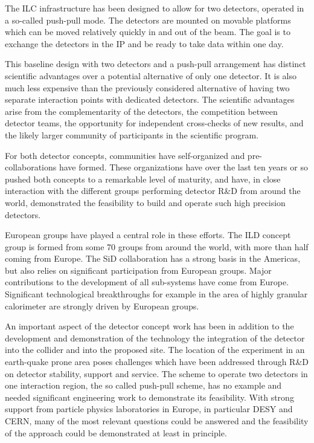 \documentclass[%
 reprint,
 amsmath,amssymb,
 aps,
]{revtex4-1}
\begin{document}
The ILC infrastructure has been designed to allow for two detectors, operated in a so-called push-pull mode. The detectors are mounted on movable platforms which can be moved relatively quickly in and out of the beam. The goal is to exchange the detectors in the IP and be ready to take data within one day. 

This baseline design with two detectors and a push-pull arrangement has distinct scientific advantages over a potential alternative of only one detector. It is also much less expensive than the previously considered alternative of having two separate interaction points with dedicated detectors. The scientific advantages arise from the complementarity of the detectors, the competition between detector teams, the opportunity for independent cross-checks of new results, and the likely larger community of participants in the scientific program. 

For both detector concepts, communities have self-organized and pre-collaborations have formed. These organizations have over the last ten years or so pushed both concepts to a remarkable level of maturity, and have, in close interaction with the different groups performing detector R\&D from around the world, demonstrated the feasibility to build and operate such high precision detectors. 

European groups have played a central role in these efforts. The ILD concept group is formed from some 70 groups from around the world, with more than half coming from Europe. The SiD collaboration has a strong basis in the Americas, but also relies on significant participation from European groups. Major contributions to the development of all sub-systems have come from Europe. Significant technological breakthroughs for example in the area of highly granular calorimeter are strongly driven by European groups. 

An important aspect of the detector concept work has been in addition to the development and demonstration of the technology the integration of the detector into the collider and into the proposed site. The location of the experiment in an earth-quake prone area poses challenges which have been addressed through R\&D on detector stability, support and service. The scheme to operate two detectors in one interaction region, the so called push-pull scheme, has no example and needed significant engineering work to demonstrate its feasibility. With strong support from particle physics laboratories in Europe, in  particular DESY and CERN, many of the most relevant questions could be answered and the feasibility of the approach could be demonstrated at least in principle. 
\end{document}
